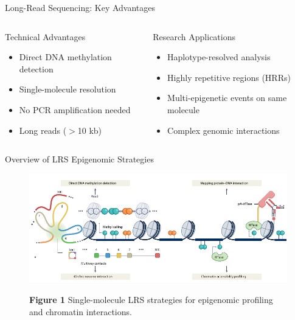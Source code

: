 \documentclass[aspectratio=169]{beamer}
\begin{document}
\begin{frame}{Long-Read Sequencing: Key Advantages}
  \begin{columns}[T]
    \begin{column}{0.48\textwidth}
      \begin{block}{Technical Advantages}
        \begin{itemize}
          \item Direct DNA methylation detection
          \item Single-molecule resolution
          \item No PCR amplification needed
          \item Long reads ($>$10 kb)
        \end{itemize}
      \end{block}
    \end{column}
    \begin{column}{0.48\textwidth}
      \begin{block}{Research Applications}
        \begin{itemize}
          \item Haplotype-resolved analysis
          \item Highly repetitive regions (HRRs)
          \item Multi-epigenetic events on same molecule
          \item Complex genomic interactions
        \end{itemize}
      \end{block}
    \end{column}
  \end{columns}
\end{frame}

\begin{frame}{Overview of LRS Epigenomic Strategies}
  \begin{figure}
    \centering
    \includegraphics[height=0.5\textheight]{figures/fig1.pdf}

    {\small \textbf{Figure 1} \textbar{} Single-molecule LRS strategies for epigenomic profiling and chromatin interactions.}
  \end{figure}
\end{frame}
\end{document}
